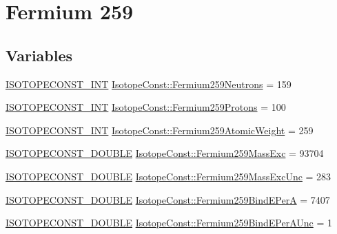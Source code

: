 \hypertarget{group___isotope_const-_fermium-_fm259}{}\section{Fermium 259}
\label{group___isotope_const-_fermium-_fm259}
\subsection*{Variables}
\begin{DoxyCompactItemize}
\item 
\mbox{\hyperlink{group___isotope_const-_macros_ga5f18360b3e99483a35c32d789e62621c}{I\+S\+O\+T\+O\+P\+E\+C\+O\+N\+S\+T\+\_\+\+I\+NT}} \mbox{\hyperlink{group___isotope_const-_fermium-_fm259_ga2395756e376e4eb83fa1187eedbd99f1}{Isotope\+Const\+::\+Fermium259\+Neutrons}} = 159
\item 
\mbox{\hyperlink{group___isotope_const-_macros_ga5f18360b3e99483a35c32d789e62621c}{I\+S\+O\+T\+O\+P\+E\+C\+O\+N\+S\+T\+\_\+\+I\+NT}} \mbox{\hyperlink{group___isotope_const-_fermium-_fm259_ga857b16ccc5e28dd0837ce2da9fcaec5f}{Isotope\+Const\+::\+Fermium259\+Protons}} = 100
\item 
\mbox{\hyperlink{group___isotope_const-_macros_ga5f18360b3e99483a35c32d789e62621c}{I\+S\+O\+T\+O\+P\+E\+C\+O\+N\+S\+T\+\_\+\+I\+NT}} \mbox{\hyperlink{group___isotope_const-_fermium-_fm259_gae5e6aeceb081aa35f4afdcf780416f9f}{Isotope\+Const\+::\+Fermium259\+Atomic\+Weight}} = 259
\item 
\mbox{\hyperlink{group___isotope_const-_macros_ga8f45a7272ce02c0b4c65c44636ed719a}{I\+S\+O\+T\+O\+P\+E\+C\+O\+N\+S\+T\+\_\+\+D\+O\+U\+B\+LE}} \mbox{\hyperlink{group___isotope_const-_fermium-_fm259_ga62f60febe73625cb02599876070e8470}{Isotope\+Const\+::\+Fermium259\+Mass\+Exc}} = 93704
\item 
\mbox{\hyperlink{group___isotope_const-_macros_ga8f45a7272ce02c0b4c65c44636ed719a}{I\+S\+O\+T\+O\+P\+E\+C\+O\+N\+S\+T\+\_\+\+D\+O\+U\+B\+LE}} \mbox{\hyperlink{group___isotope_const-_fermium-_fm259_ga0119e4c7d76058c944bcc3b1b975da7f}{Isotope\+Const\+::\+Fermium259\+Mass\+Exc\+Unc}} = 283
\item 
\mbox{\hyperlink{group___isotope_const-_macros_ga8f45a7272ce02c0b4c65c44636ed719a}{I\+S\+O\+T\+O\+P\+E\+C\+O\+N\+S\+T\+\_\+\+D\+O\+U\+B\+LE}} \mbox{\hyperlink{group___isotope_const-_fermium-_fm259_gade5b2d6d4b601638f388d4417f2befa8}{Isotope\+Const\+::\+Fermium259\+Bind\+E\+PerA}} = 7407
\item 
\mbox{\hyperlink{group___isotope_const-_macros_ga8f45a7272ce02c0b4c65c44636ed719a}{I\+S\+O\+T\+O\+P\+E\+C\+O\+N\+S\+T\+\_\+\+D\+O\+U\+B\+LE}} \mbox{\hyperlink{group___isotope_const-_fermium-_fm259_ga0818f3add9861b9caebd8e3bcaf91497}{Isotope\+Const\+::\+Fermium259\+Bind\+E\+Per\+A\+Unc}} = 1

\end{DoxyCompactItemize}
